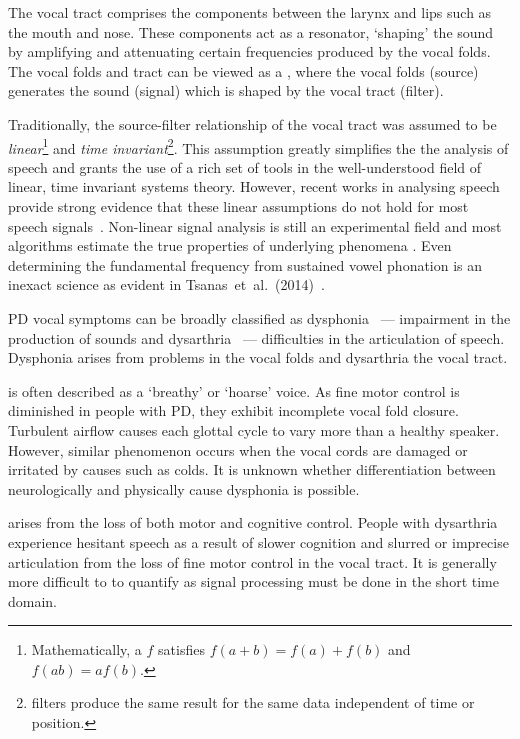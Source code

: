 \documentclass[12pt, twoside]{book}
\renewcommand\emph[1]{\textit{\color{USred}{#1}}}
\begin{document}
The vocal tract comprises the components between the larynx and lips such as the mouth and nose. These components act as a resonator, `shaping' the sound by amplifying and attenuating certain frequencies produced by the vocal folds. The vocal folds and tract can be viewed as a \emph{source-filter model}, where the vocal folds (source) generates the sound (signal) which is shaped by the vocal tract (filter). 


Traditionally, the source-filter relationship of the vocal tract was assumed to be \textit{linear}\footnote{Mathematically, a \emph{linear function} $f$ satisfies $f(a+b) = f(a) + f(b)$ and $f(ab) = af(b)$.} and \textit{time invariant}\footnote{\emph{Time invariant} filters produce the same result for the same data independent of time or position.}. This assumption greatly simplifies the the analysis of speech and grants the use of a rich set of tools in the well-understood field of linear, time invariant systems theory. However, recent works in analysing speech provide strong evidence that these linear assumptions do not hold for most speech signals~\cite{nonlineardisorder, little2007biomechanically,titze2008nonlinear}. Non-linear signal analysis is still an experimental field and most algorithms estimate the true properties of underlying phenomena . Even determining the fundamental frequency from sustained vowel phonation is an inexact science as evident in Tsanas~et~al.~(2014)~\cite{f0estimation}.


PD vocal symptoms can be broadly classified as dysphonia~\cite{spworkshoptitze} --- impairment in the production of sounds and dysarthria~\cite{rosen2006parametric} --- difficulties in the articulation of speech. Dysphonia arises from problems in the vocal folds and dysarthria the vocal tract. 

\emph{Dysphonia} is often described as a `breathy' or `hoarse' voice. As fine motor control is diminished in people with PD, they exhibit incomplete vocal fold closure. Turbulent airflow causes each glottal cycle to vary more than a healthy speaker. However, similar phenomenon occurs when the vocal cords are damaged or irritated by causes such as colds. It is unknown whether differentiation between neurologically and physically cause dysphonia is possible.  

\emph{Dysarthria} arises from the loss of both motor and cognitive control. People with dysarthria experience hesitant speech as a result of slower cognition and slurred or imprecise articulation from the loss of fine motor control in the vocal tract. It is generally more difficult to to quantify as signal processing must be done in the short time domain. 
\end{document}
